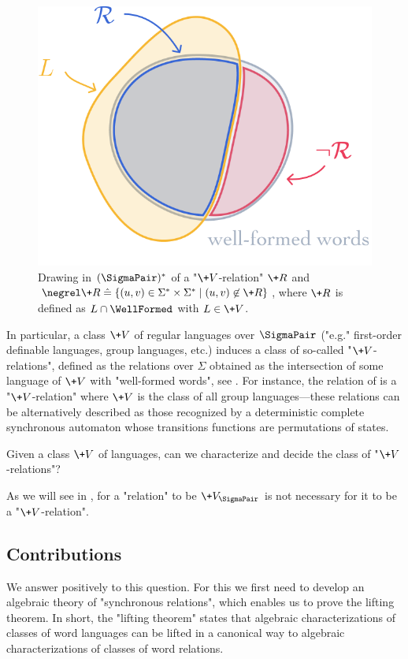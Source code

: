 \begin{figure}[htbp]
	\begin{center}
		\includegraphics[width=.4\linewidth]{fig/algebra/projection.png}
	\end{center}
	\caption{
		\label{fig:projection}
		Drawing in $(\SigmaPair)^*$ of a "$\+V$-relation" $\+R$ and $\negrel\+R \defeq \{(u,v) \in \Sigma^*\times \Sigma^* \mid (u,v) \not\in \+R\}$, where $\+R$ is defined as $L \cap \WellFormed$ with $L \in \+V$.
	} 
\end{figure}

In particular, a class $\+V$ of regular languages over
$\SigmaPair$
("e.g." first-order definable languages, group languages, etc.) induces a class of so-called
"$\+V$-relations", defined as the relations over $\Sigma$ obtained as the intersection of some 
language of $\+V$ with "well-formed words", see .
For instance, the relation of 
is a "$\+V$-relation" where $\+V$ is the class of all group languages---these relations can be 
alternatively described as those recognized by a deterministic complete synchronous automaton whose 
transitions functions are permutations of states.

\begin{question}
	\label{quest:V-relations}
	Given a class $\+V$ of languages, can we characterize and decide the class of "$\+V$-relations"?
\end{question}

As we will see in , for a "relation" to be $\+V_{\SigmaPair}$
is not necessary for it to be a "$\+V$-relation".

\subsection{Contributions}

We answer positively to this question.
For this we first need to develop an algebraic theory of "synchronous relations",
which enables us to prove the lifting theorem. In short, the "lifting theorem" states that algebraic characterizations of classes of word languages can be lifted in a canonical way to algebraic characterizations of classes of word relations.

